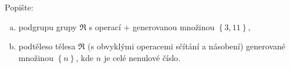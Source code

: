 \subsubsection{}
Popište:
\begin{enumerate}[a)]
  \item podgrupu grupy $\Re$ s operací $+$ generovanou množinou $\left \{ 3,11
  \right \}$,
  \item podtěleso tělesa $\Re$ (s obvyklými operacemi sčítání a násobení)
  generované množinou $\left \{ n \right \}$, kde $n$ je celé nenulové číslo.
\end{enumerate}


